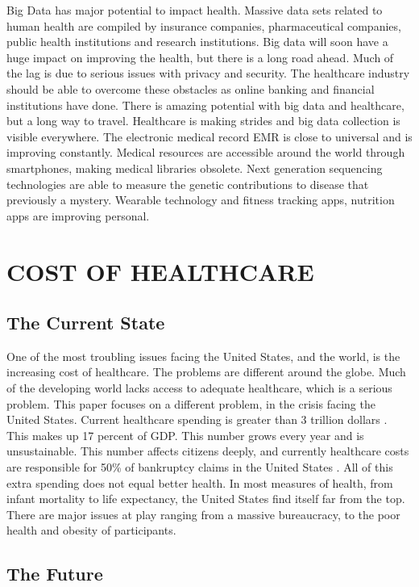 \documentclass[sigconf]{acmart}
\begin{document}
Big Data has major potential to impact health.  Massive data sets
related to human health are compiled by insurance companies,
pharmaceutical companies, public health institutions and research
institutions.  Big data will soon have a huge impact on improving the
health, but there is a long road ahead. Much of the lag is due to
serious issues with privacy and security.  The healthcare industry
should be able to overcome these obstacles as online banking and
financial institutions have done.  There is amazing potential with big
data and healthcare, but a long way to travel. \cite{fox6} Healthcare is
making strides and big data collection is visible everywhere.  The
electronic medical record EMR is close to universal and is improving
constantly.  Medical resources are accessible around the world through
smartphones, making medical libraries obsolete.  Next generation
sequencing technologies are able to measure the genetic contributions
to disease that previously a mystery. Wearable technology and fitness
tracking apps, nutrition apps are improving personal.

\section{COST OF HEALTHCARE}


\subsection{The Current State}

One of the most troubling issues facing the United States, and the
world, is the increasing cost of healthcare.  The problems are
different around the globe.  Much of the developing world lacks access
to adequate healthcare, which is a serious problem. This paper focuses
on a different problem, in the crisis facing the United
States. Current healthcare spending is greater than 3 trillion dollars
\cite{centers2014national}.  This makes up 17 percent of GDP.  This number grows every year
and is unsustainable.  This number affects citizens deeply, and
currently healthcare costs are responsible for 50\% of bankruptcy
claims in the United States \cite{fox6}. All of this extra spending does not
equal better health.  In most measures of health, from infant
mortality to life expectancy, the United States find itself far from
the top.  There are major issues at play ranging from a massive
bureaucracy, to the poor health and obesity of participants.

\subsection{The Future}
\end{document}
